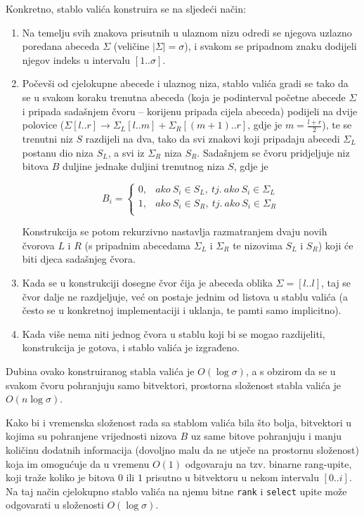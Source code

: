 \documentclass[a4paper,12pt]{article}
\begin{document}
Konkretno, stablo valića konstruira se na sljedeći način:
\begin{enumerate}
	\item Na temelju svih znakova prisutnih u ulaznom nizu odredi se njegova uzlazno poredana abeceda $\Sigma$ (veličine $|\Sigma| = \sigma$), i svakom se pripadnom znaku dodijeli njegov indeks u intervalu $[1..\sigma]$.

	\item Počevši od cjelokupne abecede i ulaznog niza, stablo valića gradi se tako da se u svakom koraku trenutna abeceda (koja je podinterval početne abecede $\Sigma$ i pripada sadašnjem čvoru -- korijenu pripada cijela abeceda) podijeli na dvije polovice ($\Sigma[l..r] \rightarrow \Sigma_L[l..m] + \Sigma_R[(m+1)..r]$, gdje je $m = \frac{l+r}{2}$), te se trenutni niz $S$ razdijeli na dva, tako da svi znakovi koji pripadaju abecedi $\Sigma_L$ postanu dio niza $S_L$, a svi iz $\Sigma_R$ niza $S_R$. Sadašnjem se čvoru pridjeljuje niz bitova $B$ duljine jednake duljini trenutnog niza $S$, gdje je

	$$
	B_i =
	\begin{cases}
	0, & ako\ S_i \in S_L,\ tj.\ ako\ S_i \in \Sigma_L \\
	1, & ako\ S_i \in S_R,\ tj.\ ako\ S_i \in \Sigma_R \\
	\end{cases}
	$$

	Konstrukcija se potom rekurzivno nastavlja razmatranjem dvaju novih čvorova $L$ i $R$ (s pripadnim abecedama $\Sigma_L$ i $\Sigma_R$ te nizovima $S_L$ i $S_R$) koji će biti djeca sadašnjeg čvora.

	\item Kada se u konstrukciji dosegne čvor čija je abeceda oblika $\Sigma = [l..l]$, taj se čvor dalje ne razdjeljuje, već on postaje jednim od listova u stablu valića (a često se u konkretnoj implementaciji i uklanja, te pamti samo implicitno).

	\item Kada više nema niti jednog čvora u stablu koji bi se mogao razdijeliti, konstrukcija je gotova, i stablo valića je izgrađeno.
\end{enumerate}

Dubina ovako konstruiranog stabla valića je $O(\log\sigma)$, a s obzirom da se u svakom čvoru pohranjuju samo bitvektori, prostorna složenost stabla valića je $O(n\log\sigma)$.

Kako bi i vremenska složenost rada sa stablom valića bila što bolja, bitvektori u kojima su pohranjene vrijednosti nizova $B$ uz same bitove pohranjuju i manju količinu dodatnih informacija (dovoljno malu da ne utječe na prostornu složenost) koja im omogućuje da u vremenu $O(1)$ odgovaraju na tzv. binarne rang-upite, koji traže koliko je bitova $0$ ili $1$ prisutno u bitvektoru u nekom intervalu $[0..i]$. Na taj način cjelokupno stablo valića na njemu bitne \texttt{rank} i \texttt{select} upite može odgovarati u složenosti $O(\log\sigma)$.
\end{document}
